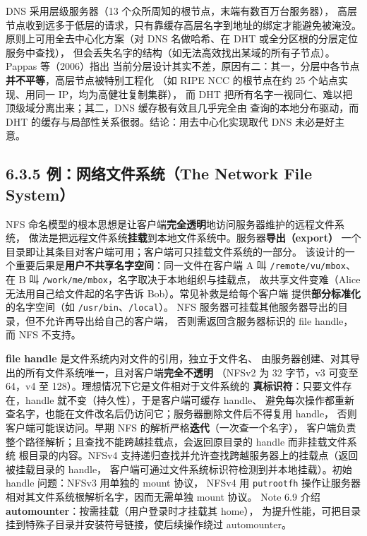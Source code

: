 \begin{ideabox}
DNS 采用层级服务器（13 个众所周知的根节点，末端有数百万台服务器），
高层节点收到远多于低层的请求，只有靠缓存高层名字到地址的绑定才能避免被淹没。
原则上可用全去中心化方案（对 DNS 名做哈希、在 DHT 或全分区根的分层定位服务中查找），
但会丢失名字的结构（如无法高效找出某域的所有子节点）。Pappas 等（2006）指出
当前分层设计其实不差，原因有二：其一，分层中各节点\textbf{并不平等}，高层节点被特别工程化
（如 RIPE NCC 的根节点在约 25 个站点实现、用同一 IP，均为高健壮复制集群），
而 DHT 把所有名字一视同仁、难以把顶级域分离出来；其二，DNS 缓存极有效且几乎完全由
查询的本地分布驱动，而 DHT 的缓存与局部性关系很弱。结论：用去中心化实现取代 DNS
未必是好主意。
\end{ideabox}

\subsection*{6.3.5 例：网络文件系统（The Network File System）}
NFS 命名模型的根本思想是让客户端\textbf{完全透明}地访问服务器维护的远程文件系统，
做法是把远程文件系统\textbf{挂载}到本地文件系统中。服务器\textbf{导出（export）}
一个目录即让其条目对客户端可用；客户端可只挂载文件系统的一部分。
该设计的一个重要后果是\textbf{用户不共享名字空间}：同一文件在客户端 A 叫
\texttt{/remote/vu/mbox}、在 B 叫 \texttt{/work/me/mbox}，名字取决于本地组织与挂载点，
故共享文件变难（Alice 无法用自己给文件起的名字告诉 Bob）。常见补救是给每个客户端
提供\textbf{部分标准化}的名字空间（如 \texttt{/usr/bin}、\texttt{/local}）。
NFS 服务器可挂载其他服务器导出的目录，但不允许再导出给自己的客户端，
否则需返回含服务器标识的 file handle，而 NFS 不支持。

\medskip\noindent \textbf{file handle} 是文件系统内对文件的引用，独立于文件名、
由服务器创建、对其导出的所有文件系统唯一，且对客户端\textbf{完全不透明}
（NFSv2 为 32 字节，v3 可变至 64，v4 至 128）。理想情况下它是文件相对于文件系统的
\textbf{真标识符}：只要文件存在，handle 就不变（持久性），于是客户端可缓存 handle、
避免每次操作都重新查名字，也能在文件改名后仍访问它；服务器删除文件后不得复用 handle，
否则客户端可能误访问。早期 NFS 的解析严格\textbf{迭代}（一次查一个名字），
客户端负责整个路径解析；且查找不能跨越挂载点，会返回原目录的 handle 而非挂载文件系统
根目录的内容。NFSv4 支持递归查找并允许查找跨越服务器上的挂载点（返回被挂载目录的 handle，
客户端可通过文件系统标识符检测到并本地挂载）。初始 handle 问题：NFSv3 用单独的 mount 协议，
NFSv4 用 \texttt{putrootfh} 操作让服务器相对其文件系统根解析名字，因而无需单独 mount 协议。
Note 6.9 介绍 \textbf{automounter}：按需挂载（用户登录时才挂载其 home），
为提升性能，可把目录挂到特殊子目录并安装符号链接，使后续操作绕过 automounter。

